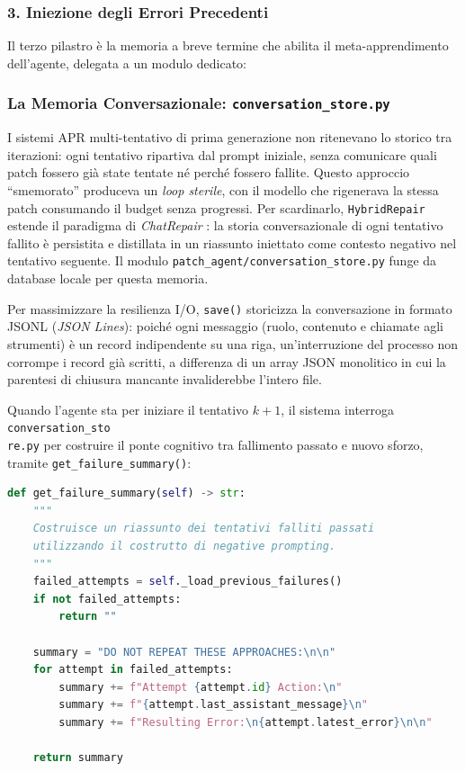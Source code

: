 \subsubsection{3. Iniezione degli Errori Precedenti}
Il terzo pilastro è la memoria a breve termine che abilita il meta-apprendimento dell'agente, delegata a un
modulo dedicato:
\subsubsection{La Memoria Conversazionale: \texttt{conversation\_store.py}}
\label{subsubsec:3.4.2.7}
I sistemi APR multi-tentativo di prima generazione non ritenevano lo storico tra iterazioni: ogni tentativo
ripartiva dal prompt iniziale, senza comunicare quali patch fossero già state tentate né perché fossero fallite.
Questo approccio ``smemorato'' produceva un \textit{loop sterile}, con il modello che rigenerava la stessa patch
consumando il budget senza progressi. Per scardinarlo, \texttt{HybridRepair} estende il paradigma di
\textit{ChatRepair} \cite{xia2023chatrepair}: la storia conversazionale di ogni tentativo fallito è persistita e
distillata in un riassunto iniettato come contesto negativo nel tentativo seguente. Il modulo
\texttt{patch\_agent/conversation\_store.py} funge da database locale per questa memoria.

Per massimizzare la resilienza I/O,  \texttt{save()} storicizza la conversazione in formato JSONL (\textit{JSON
Lines}): poiché ogni messaggio (ruolo, contenuto e chiamate agli strumenti) è un record indipendente su una riga,
un'interruzione del processo non corrompe i record già scritti, a differenza di un array JSON monolitico in cui la
parentesi di chiusura mancante invaliderebbe l'intero file.

Quando l'agente sta per iniziare il tentativo $k+1$, il sistema interroga \texttt{conversation\_sto\\re.py} per
costruire il ponte cognitivo tra fallimento passato e nuovo sforzo, tramite \texttt{get\_failure\_summary()}:

\begin{lstlisting}[language=Python, label={lst:get_failure_summary}]
def get_failure_summary(self) -> str:
    """
    Costruisce un riassunto dei tentativi falliti passati
    utilizzando il costrutto di negative prompting.
    """
    failed_attempts = self._load_previous_failures()
    if not failed_attempts:
        return ""

    summary = "DO NOT REPEAT THESE APPROACHES:\n\n"
    for attempt in failed_attempts:
        summary += f"Attempt {attempt.id} Action:\n"
        summary += f"{attempt.last_assistant_message}\n"
        summary += f"Resulting Error:\n{attempt.latest_error}\n\n"
        
    return summary
\end{lstlisting}

